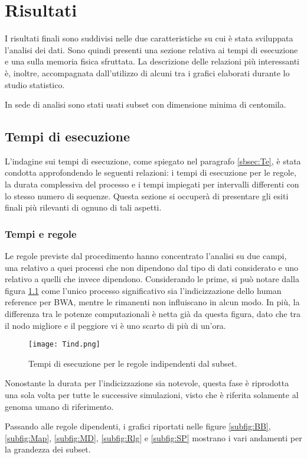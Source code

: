 \chapter{Risultati}
\label{cap:3}
I risultati finali sono suddivisi nelle due caratteristiche su cui è stata sviluppata l'analisi dei dati.
Sono quindi presenti una sezione relativa ai tempi di esecuzione e una sulla memoria fisica sfruttata. 
La descrizione delle relazioni più interessanti è, inoltre, accompagnata dall'utilizzo di alcuni tra i grafici elaborati durante lo studio statistico.

In sede di analisi sono stati usati subset con dimensione minima di centomila.

\section{Tempi di esecuzione}
L'indagine sui tempi di esecuzione, come spiegato nel paragrafo \ref{sbsec:Te}, è stata condotta approfondendo le seguenti relazioni: i tempi di esecuzione per le regole, la durata complessiva del processo e i tempi impiegati per intervalli differenti con lo stesso numero di sequenze. 
Questa sezione si occuperà di presentare gli esiti finali più rilevanti di ognuno di tali aspetti.

\subsection{Tempi e regole}
Le regole previste dal procedimento hanno concentrato l'analisi su due campi, una relativo a quei processi che non dipendono dal tipo di dati considerato e uno relativo a quelli che invece dipendono. 
Considerando le prime, si può notare dalla figura \ref{fig:Tind} come l'unico processo significativo sia l'indicizzazione dello human reference per BWA, mentre le rimanenti non influiscano in alcun modo. 
In più, la differenza tra le potenze computazionali è netta già da questa figura, dato che tra il nodo migliore e il peggiore vi è uno scarto di più di un'ora.
\begin{figure}[H]
\centering
\texttt{[image: Tind.png]}
\caption{Tempi di esecuzione per le regole indipendenti dal subset.}
\label{fig:Tind}
\end{figure}
Nonostante la durata per l'indicizzazione sia notevole, questa fase è riprodotta una sola volta per tutte le successive simulazioni, visto che è riferita solamente al genoma umano di riferimento.

Passando alle regole dipendenti, i grafici riportati nelle figure \ref{subfig:BB}, \ref{subfig:Map}, \ref{subfig:MD}, \ref{subfig:Rlg} e \ref{subfig:SP} mostrano i vari andamenti per la grandezza dei subset.

